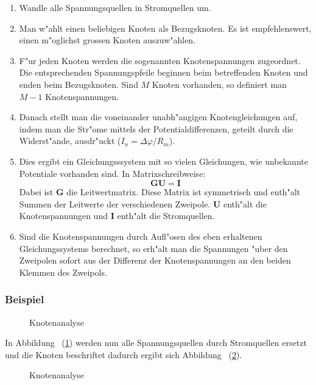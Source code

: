 \documentclass[german, 10pt, a4paper, headsepline]{scrreprt}
\theoremstyle{remark}
\begin{document}
\begin{enumerate}
	\item Wandle alle Spannungsquellen in Stromquellen um.
	\item Man w"ahlt einen beliebigen Knoten als Bezugsknoten. Es ist empfehlenswert, einen m"oglichst grossen Knoten auszuw"ahlen.
	\item F"ur jeden Knoten werden die sogenannten Knotenspannungen zugeordnet. Die entsprechenden Spannungspfeile beginnen beim betreffenden Knoten und enden beim Bezugsknoten. Sind $M$ Knoten vorhanden, so definiert man $M-1$ Knotenspannungen.
	\item Danach stellt man die voneinander unabh"angigen Knotengleichungen auf, indem man die Str"ome mittels der Potentialdifferenzen, geteilt durch die Widerst"ande, ausdr"uckt ($I_n=\Delta\varphi / R_m$).
	\item Dies ergibt ein Gleichungsssystem mit so vielen Gleichungen, wie unbekannte Potentiale vorhanden sind. In Matrixschreibweise:
		\begin{displaymath}
			\mathbf{G}\mathbf{U}=\mathbf{I}
		\end{displaymath}
		Dabei ist $\mathbf{G}$ die Leitwertmatrix. Diese Matrix ist symmetrisch und enth"alt Summen der Leitwerte der verschiedenen Zweipole. $\mathbf{U}$ enth"alt die Knotenspannungen und $\mathbf{I}$ enth"alt die Stromquellen.
	\item Sind die Knotenspannungen durch Aufl"osen des eben erhaltenen Gleichungssystems berechnet, so erh"alt man die Spannungen "uber den Zweipolen sofort aus der Differenz der Knotenspannungen an den beiden Klemmen des Zweipols.
\end{enumerate}

\subsubsection{Beispiel}

\begin{figure}[hbt]
 
 \centerline{\box\graph}
 \caption{Knotenanalyse}
 \label{knotenanalyse_fig}
\end{figure}

In Abbildung ~(\ref{knotenanalyse_fig}) werden nun alle Spannungsquellen durch Stromquellen ersetzt und die Knoten beschriftet dadurch ergibt sich Abbildung ~(\ref{knotenanalyse2_fig}).

\begin{figure}[hbt]
 
 \centerline{\box\graph}
 \caption{Knotenanalyse}
 \label{knotenanalyse2_fig}
\end{figure}
\end{document}
